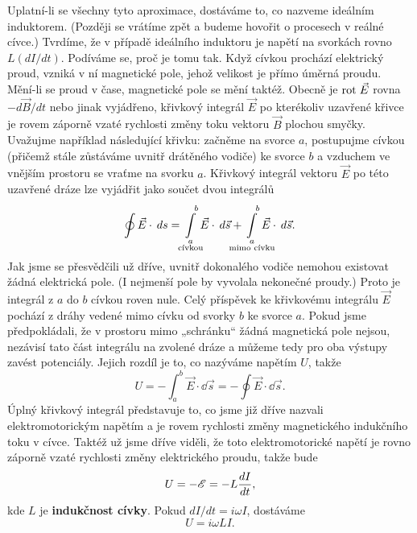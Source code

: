 {  Uplatní-li se všechny tyto aproximace, dostáváme to, co nazveme ideálním induktorem. (Později se 
  vrátíme zpět a budeme hovořit o procesech v reálné cívce.) Tvrdíme, že v případě ideálního 
  induktoru je napětí na svorkách rovno \(L(dI/dt)\). Podíváme se, proč je tomu tak. Když cívkou 
  prochází elektrický proud, vzniká v ní magnetické pole, jehož velikost je přímo úměrná proudu. 
  Mění-li se proud v čase, magnetické pole se mění taktéž. Obecně je \(\mathrm{rot}\;\vec{E}\) rovna 
  \(-d\vec{B}/dt\) nebo jinak vyjádřeno, křivkový integrál \(\vec{E}\) po kterékoliv uzavřené 
  křivce je rovem záporně vzaté rychlosti změny toku vektoru \(\vec{B}\) plochou smyčky. Uvažujme 
  například následující křivku: začněme na svorce \(a\), postupujme cívkou (přičemž stále zůstáváme 
  uvnitř drátěného vodiče) ke svorce \(b\) a vzduchem ve vnějším prostoru se vraťme na svorku 
  \(a\). Křivkový integrál vektoru \(\vec{E}\) po této uzavřené dráze lze vyjádřit jako součet dvou 
  integrálů
  \begin{equation}\label{fyz:eq468}
   \oint\vec{E}\cdot\dd{s}
     = \limitint_{\mathclap{\substack{a\\\text{cívkou}}}}^{\quad b}\vec{E}\cdot\dd{\vec{s}}
     + \limitint_{\mathclap{\substack{a\\\text{mimo cívku}}}}^{\quad b}\vec{E}\cdot\dd{\vec{s}}.
  \end{equation}
  Jak jsme se přesvědčili už dříve, uvnitř dokonalého vodiče nemohou existovat žádná elektrická 
  pole. (I nejmenší pole by vyvolala nekonečné proudy.) Proto je integrál z \(a\) do \(b\) cívkou 
  roven nule. Celý příspěvek ke křivkovému integrálu \(\vec{E}\) pochází z dráhy vedené mimo cívku 
  od svorky \(b\) ke svorce \(a\). Pokud jsme předpokládali, že v prostoru mimo „schránku“ žádná 
  magnetická pole nejsou, nezávisí tato část integrálu na zvolené dráze a můžeme tedy pro oba 
  výstupy zavést potenciály. Jejich rozdíl je to, co nazýváme napětím \(U\), takže
  \begin{equation}\label{fyz:eq469}
    U = -\int_a^b\vec{E}\cdot\dd{\vec{s}} = - \oint\vec{E}\cdot\dd{\vec{s}}.
  \end{equation}
  Úplný křivkový integrál představuje to, co jsme již dříve nazvali elektromotorickým napětím a je 
  rovem rychlosti změny magnetického indukčního toku v cívce. Taktéž už jsme dříve viděli, že toto 
  elektromotorické napětí je rovno záporně vzaté rychlosti změny elektrického proudu, takže bude
  \begin{equation}\label{fyz:eq470}
    U = -\mathscr{E} = - L\dfrac{d I}{d t},
  \end{equation}
  kde \(L\) je \textbf{indukčnost cívky}. Pokud \(dI/dt = i\omega I\), dostáváme 
  \begin{equation}\label{fyz:eq471}
    U = i\omega LI.
  \end{equation}
  
}
